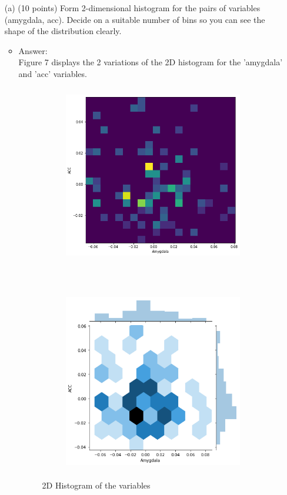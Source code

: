 \documentclass[twoside,10pt]{article}
\begin{document}
  
 \begin{enumerate}
 \item[(a)] (10 points) Form 2-dimensional histogram for the pairs of variables (\textsf{amygdala}, \textsf{acc}). Decide on a suitable number of bins so you can see the shape of the distribution clearly. 
 
\begin{itemize}
\item Answer:\\
Figure 7 displays the 2 variations of the 2D histogram for the 'amygdala' and 'acc' variables.
\begin{figure}[t!]
    \centering
    \begin{subfigure}[t]{0.5\textwidth}
        \centering
        \includegraphics[height=3.1in]{Images/Q2aheatmap.png}
    \end{subfigure}%
    ~ 
    \begin{subfigure}[t]{0.5\textwidth}
        \centering
        \includegraphics[height=3.1in]{Images/Q2aheatmap2.png}
    \end{subfigure}
    \caption{2D Histogram of the variables}
\end{figure}


\end{itemize}
\end{enumerate}
\end{document}

